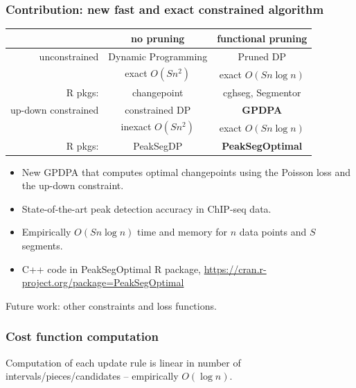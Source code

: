 \documentclass{beamer}
\begin{document}
\begin{frame}
  \frametitle{Contribution: new fast and exact constrained algorithm}
  \begin{tabular}{r|c|c}
    & no pruning & functional pruning \\
    \hline
    unconstrained & Dynamic Programming & Pruned DP \\
     & exact $O(S n^2)$ & exact $O(Sn\log n)$\\
    R pkgs: & changepoint & cghseg, Segmentor\\
    \hline
    up-down constrained & constrained DP & \textbf{GPDPA} \\
     & inexact $O(Sn^2)$ & exact $O(Sn\log n)$\\
    R pkgs: & PeakSegDP & \textbf{PeakSegOptimal}\\
    \hline 
  \end{tabular}
  \begin{itemize}
  \item New GPDPA that computes optimal changepoints 
    using the Poisson loss and the up-down constraint.
  \item State-of-the-art peak detection accuracy in ChIP-seq data.
  \item Empirically $O(S n \log n)$ time and memory for $n$ data
    points and $S$ segments.
  \item C++ code in PeakSegOptimal R package, 
    \url{https://cran.r-project.org/package=PeakSegOptimal}
  \end{itemize}
  Future work: other constraints and loss functions.
\end{frame}

\begin{frame}
  \frametitle{Cost function computation}
  Computation of each update rule is linear in number of
  intervals/pieces/candidates -- empirically $O(\log n)$.
  \begin{minipage}[t]{\linewidth}
  \hskip -1cm
   
  \end{minipage}
\end{frame}
\end{document}
